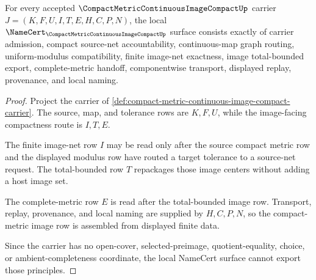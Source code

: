 \begin{theorem}
\label{thm:compact-metric-continuous-image-compact-namecert-obligations}
For every accepted $\CompactMetricContinuousImageCompactUp$ carrier $J=(K,F,U,I,T,E,H,C,P,N)$, the local $\NameCert_{\CompactMetricContinuousImageCompactUp}$ surface consists exactly of carrier admission, compact source-net accountability, continuous-map graph routing, uniform-modulus compatibility, finite image-net exactness, image total-bounded export, complete-metric handoff, componentwise transport, displayed replay, provenance, and local naming.
\end{theorem}
\begin{proof}
Project the carrier of \autoref{def:compact-metric-continuous-image-compact-carrier}. The source, map, and tolerance rows are $K,F,U$, while the image-facing compactness route is $I,T,E$.

The finite image-net row $I$ may be read only after the source compact metric row and the displayed modulus row have routed a target tolerance to a source-net request. The total-bounded row $T$ repackages those image centers without adding a host image set.

The complete-metric row $E$ is read after the total-bounded image row. Transport, replay, provenance, and local naming are supplied by $H,C,P,N$, so the compact-metric image row is assembled from displayed finite data.

Since the carrier has no open-cover, selected-preimage, quotient-equality, choice, or ambient-completeness coordinate, the local NameCert surface cannot export those principles.
\end{proof}

